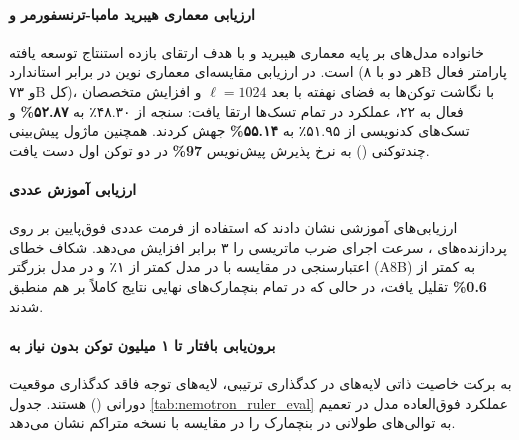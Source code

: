 \item {}

\paragraph*{ارزیابی معماری هیبرید مامبا-ترنسفورمر و }
خانواده مدل‌های  \cite{nemotron3team2025} بر پایه معماری هیبرید  و  با هدف ارتقای بازده استنتاج توسعه یافته است. در ارزیابی مقایسه‌ای معماری نوین  در برابر  استاندارد (هر دو با ۸B پارامتر فعال و ۷۳B کل)، با نگاشت توکن‌ها به فضای نهفته با بعد $\ell=1024$ و افزایش متخصصان فعال به ۲۲، عملکرد در تمام تسک‌ها ارتقا یافت: سنجه  از ۴۸.۳۰٪ به \textbf{۵۲.۸۷\%} و تسک‌های کدنویسی از ۵۱.۹۵٪ به \textbf{۵۵.۱۴\%} جهش کردند. همچنین ماژول پیش‌بینی چندتوکنی () به نرخ پذیرش پیش‌نویس \textbf{97\%} در دو توکن اول دست یافت.

\paragraph*{ارزیابی آموزش عددی }
ارزیابی‌های آموزشی نشان دادند که استفاده از فرمت عددی فوق‌پایین  بر روی پردازنده‌های ، سرعت اجرای ضرب ماتریسی را ۳ برابر افزایش می‌دهد. شکاف خطای اعتبارسنجی در مقایسه با  در مدل  کمتر از ۱٪ و در مدل بزرگتر (A8B) به کمتر از \textbf{0.6\%} تقلیل یافت، در حالی که در تمام بنچمارک‌های نهایی نتایج کاملاً بر هم منطبق شدند.

\paragraph*{برون‌یابی بافتار تا ۱ میلیون توکن بدون نیاز به }
به برکت خاصیت ذاتی لایه‌های  در کدگذاری ترتیبی، لایه‌های توجه فاقد کدگذاری موقعیت دورانی () هستند. جدول \ref{tab:nemotron_ruler_eval} عملکرد فوق‌العاده مدل در تعمیم به توالی‌های طولانی در بنچمارک  را در مقایسه با نسخه متراکم نشان می‌دهد.

\begin{table}[htbp]
\centering
\caption{ارزیابی مقایسه‌ای بنچمارک  در طول‌های بافتار گوناگون}
\label{tab:nemotron_ruler_eval}
\end{table}

